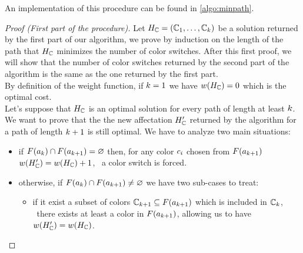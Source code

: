 An implementation of this procedure can be found in \cref{algo:minpath}.


\begin{proof}[Proof (First part of the procedure)]
  Let $H_{\mathbb{C}} = (\mathbb{C}_1,\ldots,\mathbb{C}_{k})$ be a solution returned by the first part of our algorithm, we prove by induction on the length of the path that $H_{\mathbb{C}}$ minimizes the number of color switches. After this first proof, we will show that the number of color switches returned by the second part of the algorithm is the same as the one returned by the first part. \\
  By definition of the weight function, if $k = 1$ we have $w(H_{\mathbb{C}}) = 0$ which is the optimal cost.\\
  Let's suppose that $H_{\mathbb{C}}$ is an optimal solution for every path of length at least $k$. We want to prove that the the new affectation $H_{\mathbb{C}}'$ returned by the algorithm for a path of length $k+1$ is still optimal. We have to analyze two main situations:

  \begin{itemize}
    \item if $F(a_k) \cap F(a_{k+1}) = \varnothing$ then, for any color $c_i$ chosen from $F(a_{k+1})$ $w(H_{\mathbb{C}}') = w(H_{\mathbb{C}}) + 1$, \ie\ a color switch is forced.
    \item otherwise, if $F(a_k) \cap F(a_{k+1}) \neq \varnothing$ we have two sub-cases to treat:
          \begin{itemize}

            \item if it exist a subset of colors $\mathbb{C}_{k+1} \subseteq F(a_{k+1})$ which is included in $\mathbb{C}_k$, \ie\ there exists at least a color in $F(a_{k+1})$, allowing us to have $w(H_{\mathbb{C}}') = w(H_{\mathbb{C}})$.


\end{itemize}
\end{itemize}
\end{proof}
